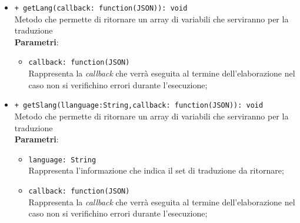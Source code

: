 \begin{itemize}
\begin{itemize}
\begin{itemize}
					\end{itemize}
				\item \texttt{+ getLang(callback: function(JSON)): void} \\
				Metodo che permette di ritornare un array di variabili che serviranno per la traduzione \\
					\textbf{Parametri}:
					\begin{itemize}
						\item \texttt{callback: function(JSON)} \\
						Rappresenta la \textit{callback} che verrà eseguita al termine dell'elaborazione nel caso non si verifichino errori durante l'esecuzione;
					\end{itemize}	
				\item \texttt{+ getSlang(llanguage:String,callback: function(JSON)): void} \\
				Metodo che permette di ritornare un array di variabili che serviranno per la traduzione \\
					\textbf{Parametri}:
					\begin{itemize}
							\item \texttt{language: String} \\
							Rappresenta l'informazione che indica il set di traduzione da ritornare;
							\item \texttt{callback: function(JSON)} \\
							Rappresenta la \textit{callback} che verrà eseguita al termine dell'elaborazione nel caso non si verifichino errori durante l'esecuzione;
					\end{itemize}	
			\end{itemize}
	\end{itemize}
	